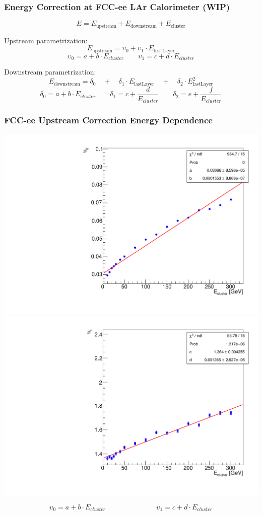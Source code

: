 \documentclass[aspectratio=169]{beamer}
\newcommand{\redtext}[1]{%
  \textcolor{myRed}{#1}
}
\begin{document}
\begin{frame}
  \frametitle{Energy Correction at FCC-ee LAr Calorimeter (WIP)}

  \begin{equation*}
    E = E_\text{upstream} + E_\text{downstream} + E_\text{cluster}
  \end{equation*}

  \redtext{Upstream} parametrization:
  \begin{equation*}
  E_\text{upstream} = \upsilon_0 + \upsilon_1 \cdot E_\text{firstLayer}
  \end{equation*}
  \begin{equation*}
    \upsilon_0 = a + b \cdot E_{cluster}  \qquad
    \upsilon_1 = c + d \cdot E_{cluster}
  \end{equation*}

  \redtext{Downstream} parametrization:
  \begin{equation*}
  E_\text{downstream} = \delta_0 \quad + \quad
                        \delta_1 \cdot E_\text{lastLayer} \quad + \quad
                        \delta_2 \cdot E_\text{lastLayer}^{2}
  \end{equation*}
  \begin{equation*}
    \delta_0 = a + b \cdot E_{cluster}  \qquad
    \delta_1 = c + \frac{d}{E_{cluster}} \qquad
    \delta_2 = e + \frac{f}{E_{cluster}}
  \end{equation*}
\end{frame}

\begin{frame}
  \frametitle{FCC-ee Upstream Correction Energy Dependence}

  \begin{adjustwidth}{-9mm}{-9mm}
    \includegraphics[width=0.49\linewidth]{figures/12layers/graph_upstream_upsilon_0.pdf}
    \includegraphics[width=0.49\linewidth]{figures/12layers/graph_upstream_upsilon_1.pdf}\\[-3ex]
  \end{adjustwidth}
  \begin{equation*}
    \upsilon_0 = a + b \cdot E_{cluster}  \hspace{3cm}
    \upsilon_1 = c + d \cdot E_{cluster}
  \end{equation*}
\end{frame}
\end{document}
